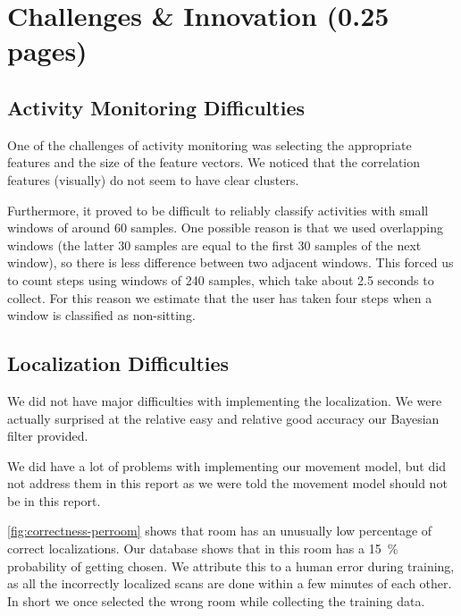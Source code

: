 \documentclass[a4paper,10pt,twoside]{IEEEtran}
\begin{document}
\section{Challenges \& Innovation (0.25 pages)}
\label{sec:innovation}
\subsection{Activity Monitoring Difficulties}
One of the challenges of activity monitoring was selecting the appropriate features and the size of the feature vectors.
We noticed that the correlation features (visually) do not seem to have clear clusters.

Furthermore, it proved to be difficult to reliably classify activities with small windows of around 60 samples. One possible reason is that we used overlapping windows (the latter 30 samples are equal to the first 30 samples of the next window), so there is less difference between two adjacent windows.
This forced us to count steps using windows of 240 samples, which take about 2.5 seconds to collect.
For this reason we estimate that the user has taken four steps when a window is classified as non-sitting.

\subsection{Localization Difficulties}

We did not have major difficulties with implementing the localization.
We were actually surprised at the relative easy and relative good accuracy our Bayesian filter provided.

We did have a lot of problems with implementing our movement model, but did not address them in this report as we were told the movement model should not be in this report.

\autoref{fig:correctness-perroom} shows that room  has an unusually low percentage of correct localizations. Our database shows that in this room  has a 15~\% probability of getting chosen.
We attribute this to a human error during training, as all the incorrectly localized scans are done within a few minutes of each other.
In short we once selected the wrong room while collecting the training data.
\end{document}
